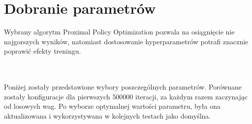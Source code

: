 \section{Dobranie parametrów}
Wybrany algorytm Proximal Policy Optimization pozwala na osiągnięcie nie najgorszych wyników, natomiast dostosowanie hyperparametrów potrafi znacznie poprawić efekty treningu.
\\\\
\phantom{.}\\
Poniżej zostały przedstawione wybory poszczególnych parametrów. Porównane zostały konfiguracje dla pierwszych $500 000$ iteracji, za każdym razem zaczynając od losowych wag. Po wyborze optymalnej wartości parametru, była ona aktualizowana i wykorzystywana w kolejnych testach jako domyślna.\\

